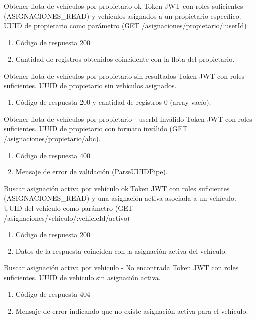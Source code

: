 {Obtener flota de vehículos por propietario ok}
{Token JWT con roles suficientes (ASIGNACIONES\_READ) y vehículos asignados a un propietario específico.}
{UUID de propietario como parámetro (GET /asignaciones/propietario/:userId)}
{\begin{enumerate} [leftmargin=*, nosep]
    \item Código de respuesta 200
    \item Cantidad de registros obtenidos coincidente con la flota del propietario.
\end{enumerate}}

{Obtener flota de vehículos por propietario sin resultados}
{Token JWT con roles suficientes.}
{UUID de propietario sin vehículos asignados.}
{\begin{enumerate} [leftmargin=*, nosep]
    \item Código de respuesta 200 y cantidad de registros 0 (array vacío).
\end{enumerate}}

{Obtener flota de vehículos por propietario - userId inválido}
{Token JWT con roles suficientes.}
{UUID de propietario con formato inválido (GET /asignaciones/propietario/abc).}
{\begin{enumerate} [leftmargin=*, nosep]
    \item Código de respuesta 400
    \item Mensaje de error de validación (ParseUUIDPipe).
\end{enumerate}}

{Buscar asignación activa por vehículo ok}
{Token JWT con roles suficientes (ASIGNACIONES\_READ) y una asignación activa asociada a un vehículo.}
{UUID del vehículo como parámetro (GET /asignaciones/vehiculo/:vehicleId/activo)}
{\begin{enumerate} [leftmargin=*, nosep]
    \item Código de respuesta 200
    \item Datos de la respuesta coinciden con la asignación activa del vehículo.
\end{enumerate}}

{Buscar asignación activa por vehículo - No encontrada}
{Token JWT con roles suficientes.}
{UUID de vehículo sin asignación activa.}
{\begin{enumerate} [leftmargin=*, nosep]
    \item Código de respuesta 404
    \item Mensaje de error indicando que no existe asignación activa para el vehículo.
\end{enumerate}}

